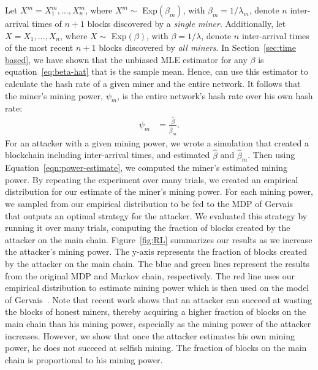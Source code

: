 Let $X^m = X_1^m, \dots, X_{n}^m$, where $X^m \sim$ Exp$(\beta_m)$, with $\beta_m = 1/\lambda_m$, denote $n$ inter-arrival times of $n+1$ blocks discovered by a {\em single miner}. Additionally, let $X = X_1, \dots, X_{n}$, where $X \sim$ Exp$(\beta)$, with $\beta = 1/\lambda$, denote $n$ inter-arrival times of the most recent $n+1$ blocks discovered by {\em all miners}.
In Section~\ref{sec:time based}, we have shown that the unbiased MLE estimator for any $\beta$ is equation~\ref{eq:beta-hat} that is the sample mean. Hence, can use this estimator to calculate the hash rate of a given miner and the entire network. It follows that the miner's mining power, $\psi_m$, is the entire network's hash rate over his own hash rate:
\begin{align}
\psi_m &= \frac{\hat{\beta}}{\hat{\beta}_m}.\label{eqn:power-estimate}
\end{align} 
 For an attacker with a given mining power, we wrote a simulation that created a blockchain including inter-arrival times, and estimated $\hat{\beta}$ and $\hat{\beta}_m$. Then using Equation~\ref{eqn:power-estimate}, we computed the miner's estimated mining power. By repeating the experiment over many trials, we created an empirical distribution for our estimate of the miner's mining power. For each mining power, we sampled from our empirical distribution to be fed to the MDP of Gervais~\cite{Gervais:2016} that outputs an optimal strategy for the attacker. We evaluated this strategy by running it over many trials, computing the fraction of blocks created by the attacker on the main chain. Figure~\ref{fig:RL} summarizes our results as we increase the attacker's mining power. The y-axis represents the fraction of blocks created by the attacker on the main chain. The blue and green lines represent the results from the original MDP and Markov chain, respectively. The red line uses our empirical distribution to estimate mining power which is then used on the model of Gervais~\cite{Gervais:2016}. Note that recent work shows that an attacker can succeed at wasting the blocks of honest miners, thereby acquiring a higher fraction of blocks on the main chain than his mining power, especially as the mining power of the attacker increases. However, we show that once the attacker estimates his own mining power, he does not succeed at selfish mining. The fraction of blocks on the main chain is proportional to his mining power.

